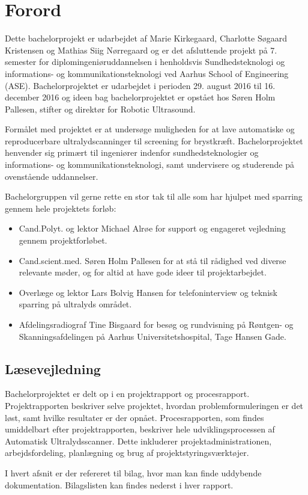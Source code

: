 \chapter{Forord}
Dette bachelorprojekt er udarbejdet af Marie Kirkegaard, Charlotte Søgaard Kristensen og Mathias Siig Nørregaard og er det afsluttende projekt på 7. semester for diplomingeniøruddannelsen i henholdsvis Sundhedsteknologi og informations- og kommunikationsteknologi ved Aarhus School of Engineering (ASE). Bachelorprojektet er udarbejdet i perioden 29. august 2016 til 16. december 2016 og ideen bag bachelorprojektet er opstået hos Søren Holm Pallesen, stifter og direktør for Robotic Ultrasound. 

Formålet med projektet er at undersøge muligheden for at lave automatiske og reproducerbare ultralydscanninger til screening for brystkræft. Bachelorprojektet henvender sig primært til ingeniører indenfor sundhedsteknologier og informations- og  kommunikationsteknologi, samt undervisere og studerende på ovenstående uddannelser. 

Bachelorgruppen vil gerne rette en stor tak til alle som har hjulpet med sparring gennem hele projektets forløb:

\let\labelitemi\labelitemii
\begin{itemize}
\item Cand.Polyt. og lektor Michael Alrøe for support og engageret vejledning gennem projektforløbet.

\item Cand.scient.med. Søren Holm Pallesen for at stå til rådighed ved diverse relevante
møder, og for altid at have gode ideer til projektarbejdet.

\item Overlæge og lektor Lars Bolvig Hansen for telefoninterview og teknisk sparring på ultralyds området.

\item Afdelingsradiograf Tine Bisgaard for besøg og rundvisning på Røntgen- og Skanningsafdelingen på Aarhus Universitetshospital, Tage Hansen Gade. 
\end{itemize}

\section{Læsevejledning} 
Bachelorprojektet er delt op i en projektrapport og procesrapport. Projektrapporten beskriver selve projektet, hvordan problemformuleringen er det løst, samt hvilke resultater er der opnået. Procesrapporten, som findes umiddelbart efter projektrapporten, beskriver hele udviklingsprocessen af Automatisk Ultralydsscanner. Dette inkluderer projektadministrationen, arbejdsfordeling, planlægning og brug af projektstyringsværktøjer. 

I hvert afsnit er der refereret til bilag, hvor man kan finde uddybende dokumentation. Bilagslisten kan findes nederst i hver rapport.   
